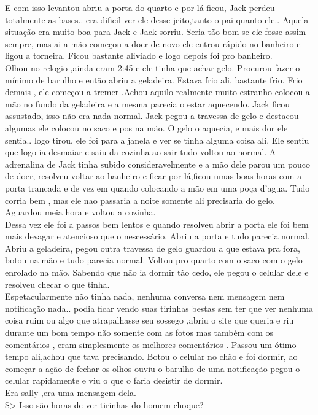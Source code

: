 \documentclass{book}
\begin{document}
 E com isso levantou abriu a porta do quarto e por lá ficou, Jack perdeu totalmente as bases.. era dificil ver ele desse jeito,tanto o pai quanto ele.. Aquela situação era muito boa para Jack e Jack sorriu. Seria tão bom se ele fosse assim sempre, mas ai a mão começou a doer de novo ele entrou rápido no banheiro e ligou a torneira. Ficou bastante aliviado e logo depois foi pro banheiro.\\
 Olhou no relogio ,ainda eram 2:45 e ele tinha que achar gelo. Procurou fazer o mínimo de barulho e então abriu a geladeira. Estava frio ali, bastante frio. Frio demais , ele começou a tremer .Achou aquilo realmente muito estranho colocou a mão no fundo da geladeira e a mesma parecia o estar aquecendo. Jack ficou assustado, isso não era nada normal. Jack pegou a travessa de gelo e destacou algumas ele colocou no saco e pos na mão. O gelo o aquecia, e mais dor ele sentia.. logo tirou, ele foi para a janela e ver se tinha alguma coisa ali. Ele sentiu que logo ia desmaiar e saiu da cozinha ao sair tudo voltou ao normal. A adrenalina de Jack tinha subido consideravelmente e a mão dele parou um pouco de doer, resolveu voltar ao banheiro e ficar por lá,ficou umas boas horas com a porta trancada e de vez em quando colocando a mão em uma poça d'agua. Tudo corria bem , mas ele nao passaria a noite somente ali precisaria do gelo. Aguardou meia hora e voltou a cozinha. \\
 Dessa vez ele foi a passos bem lentos e quando resolveu abrir a porta ele foi bem mais devagar e atencioso que o nescessário. Abriu a porta e tudo parecia normal. Abriu a geladeira, pegou outra travessa de gelo guardou a que estava pra fora, botou na mão  e tudo parecia normal. Voltou pro quarto com o saco com o gelo enrolado na mão. Sabendo que não ia dormir tão cedo, ele pegou o celular dele e resolveu checar o que tinha.\\
 Espetacularmente não tinha nada, nenhuma conversa nem mensagem nem notificação nada.. podia ficar vendo suas tirinhas bestas sem ter que ver nenhuma coisa ruim ou algo que atrapalhasse seu sossego ,abriu o site que queria e riu durante um bom tempo não somente com as fotos mas também com os comentários , eram simplesmente os melhores comentários . Passou um ótimo tempo ali,achou que tava precisando. Botou o celular no chão e foi dormir, ao começar a ação de fechar os olhos ouviu o barulho de uma notificação pegou o celular rapidamente e viu o que o faria desistir de dormir.\\
 Era sally ,era uma mensagem dela.\\
 S> Isso são horas de ver tirinhas do homem choque?\\
 
\end{document}
